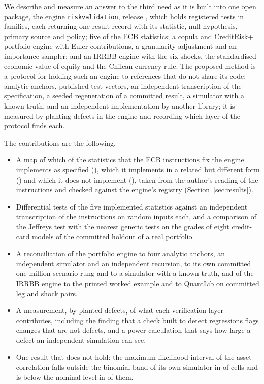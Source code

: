 We describe and measure an answer to the third need as it is built into one open package, the engine \texttt{riskvalidation}, release \inventoryVersion{}, which holds \testsTotal{} registered tests in \familiesTotal{} families, each returning one result record with its statistic, null hypothesis, primary source and policy; five of the ECB statistics; a copula and CreditRisk+ portfolio engine with Euler contributions, a granularity adjustment and an importance sampler; and an IRRBB engine with the six shocks, the standardised economic value of equity and the Chilean currency rule. The proposed method is a protocol for holding such an engine to references that do not share its code: analytic anchors, published test vectors, an independent transcription of the specification, a seeded regeneration of a committed result, a simulator with a known truth, and an independent implementation by another library; it is measured by planting defects in the engine and recording which layer of the protocol finds each.

The contributions are the following.
\begin{itemize}
\item A map of which of the \ecbSections{} statistics that the ECB instructions fix the engine implements as specified (\ecbImpl{}), which it implements in a related but different form (\ecbRelated{}) and which it does not implement (\ecbAbsent{}), taken from the author's reading of the instructions and checked against the engine's registry (Section~\ref{sec:results}).
\item Differential tests of the five implemented statistics against an independent transcription of the instructions on \ecbInputs{} random inputs each, and a comparison of the Jeffreys test with the nearest generic tests on the \cCells{} grades of eight credit-card models of the committed holdout of a real portfolio.
\item A reconciliation of the portfolio engine to four analytic anchors, an independent simulator and an independent recursion, to its own committed one-million-scenario rung and to a simulator with a known truth, and of the IRRBB engine to the printed worked example and to QuantLib on \irrLegs{} committed leg and shock pairs.
\item A measurement, by \ablMutants{} planted defects, of what each verification layer contributes, including the finding that a check built to detect regressions flags changes that are not defects, and a power calculation that says how large a defect an independent simulation can see.
\item One result that does not hold: the maximum-likelihood interval of the asset correlation falls outside the binomial band of its own simulator in \gridMlFail{} of \gridMlCells{} cells and is below the nominal level in \gridMlBelow{} of them.
\end{itemize}

